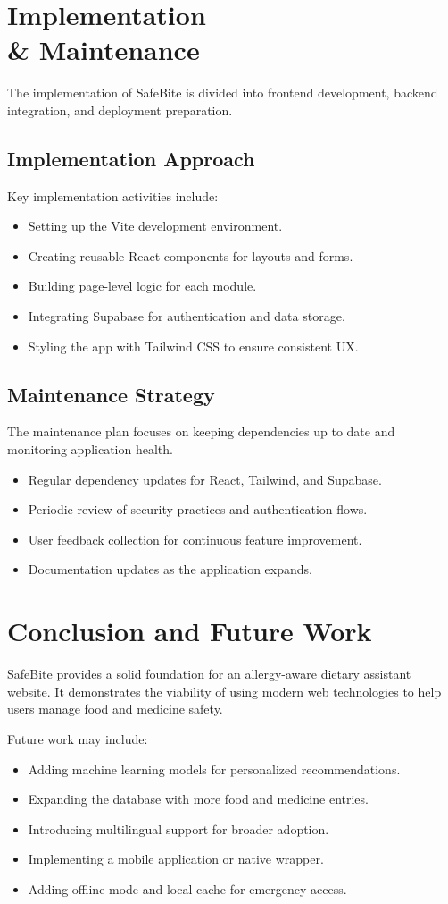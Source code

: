 \documentclass[12pt,a4paper]{report}
\begin{document}
\chapter{Implementation \\& Maintenance}
The implementation of SafeBite is divided into frontend development, backend integration, and deployment preparation.

\section{Implementation Approach}
Key implementation activities include:
\begin{itemize}
  \item Setting up the Vite development environment.
  \item Creating reusable React components for layouts and forms.
  \item Building page-level logic for each module.
  \item Integrating Supabase for authentication and data storage.
  \item Styling the app with Tailwind CSS to ensure consistent UX.
\end{itemize}

\section{Maintenance Strategy}
The maintenance plan focuses on keeping dependencies up to date and monitoring application health.
\begin{itemize}
  \item Regular dependency updates for React, Tailwind, and Supabase.
  \item Periodic review of security practices and authentication flows.
  \item User feedback collection for continuous feature improvement.
  \item Documentation updates as the application expands.
\end{itemize}

\chapter{Conclusion and Future Work}
SafeBite provides a solid foundation for an allergy-aware dietary assistant website. It demonstrates the viability of using modern web technologies to help users manage food and medicine safety.

Future work may include:
\begin{itemize}
  \item Adding machine learning models for personalized recommendations.
  \item Expanding the database with more food and medicine entries.
  \item Introducing multilingual support for broader adoption.
  \item Implementing a mobile application or native wrapper.
  \item Adding offline mode and local cache for emergency access.
\end{itemize}
\end{document}
